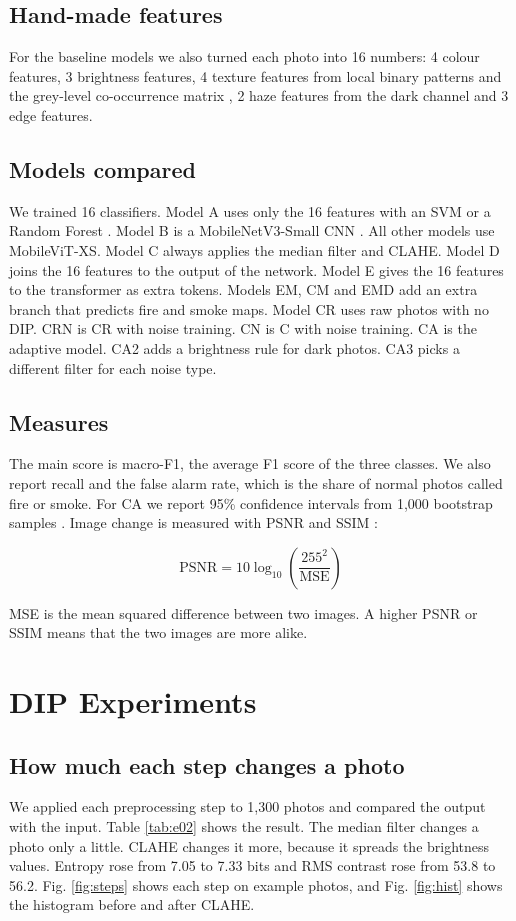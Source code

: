 \documentclass[10pt,twocolumn,letterpaper]{article}
\begin{document}
\subsection{Hand-made features}
For the baseline models we also turned each photo into 16 numbers: 4 colour features, 3 brightness features, 4 texture features from local binary patterns \cite{ojala} and the grey-level co-occurrence matrix \cite{haralick}, 2 haze features from the dark channel and 3 edge features.

\subsection{Models compared}
We trained 16 classifiers. Model A uses only the 16 features with an SVM \cite{svm} or a Random Forest \cite{rf}. Model B is a MobileNetV3-Small CNN \cite{mobilenetv3}. All other models use MobileViT-XS. Model C always applies the median filter and CLAHE. Model D joins the 16 features to the output of the network. Model E gives the 16 features to the transformer as extra tokens. Models EM, CM and EMD add an extra branch that predicts fire and smoke maps. Model CR uses raw photos with no DIP. CRN is CR with noise training. CN is C with noise training. CA is the adaptive model. CA2 adds a brightness rule for dark photos. CA3 picks a different filter for each noise type.

\subsection{Measures}
The main score is macro-F1, the average F1 score of the three classes. We also report recall and the false alarm rate, which is the share of normal photos called fire or smoke. For CA we report 95\% confidence intervals from 1,000 bootstrap samples \cite{efron}. Image change is measured with PSNR and SSIM \cite{ssim}:

\begin{equation}
  \mathrm{PSNR}=10\log_{10}\!\left(\frac{255^{2}}{\mathrm{MSE}}\right)
\end{equation}

MSE is the mean squared difference between two images. A higher PSNR or SSIM means that the two images are more alike.


\section{DIP Experiments}
\subsection{How much each step changes a photo}
We applied each preprocessing step to 1,300 photos and compared the output with the input. Table \ref{tab:e02} shows the result. The median filter changes a photo only a little. CLAHE changes it more, because it spreads the brightness values. Entropy rose from 7.05 to 7.33 bits and RMS contrast rose from 53.8 to 56.2. Fig. \ref{fig:steps} shows each step on example photos, and Fig. \ref{fig:hist} shows the histogram before and after CLAHE.
\end{document}
